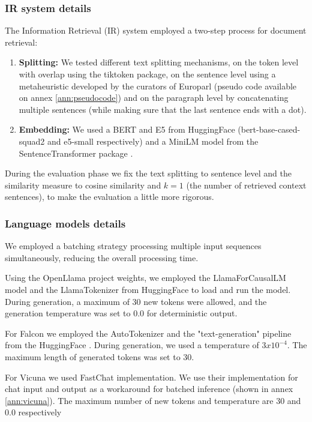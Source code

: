 \documentclass[a4paper,12pt]{article}
\begin{document}
\subsubsection*{IR system details}
The Information Retrieval (IR) system employed a two-step process for document retrieval:

\begin{enumerate}
	\item \textbf{Splitting:} We tested different text splitting mechanisms, on the token level with overlap using the tiktoken package, 
    on the sentence level using a metaheuristic developed by the curators of Europarl \cite{europarl} (pseudo code available on annex \ref{ann:pseudocode}) and on the paragraph level by concatenating multiple sentences (while making sure that the last sentence ends with a dot).
	
    \item \textbf{Embedding:} We used a BERT \cite{bert} and E5 \cite{e5} from HuggingFace \cite{huggingface} (bert-base-cased-squad2 and e5-small respectively) and a MiniLM \cite{minilm} model from the SentenceTransformer package \cite{sbert}.
\end{enumerate}

During the evaluation phase we fix the text splitting to sentence level and the similarity measure to cosine similarity and $k=1$ (the number of retrieved context sentences), to make the evaluation a little more rigorous.  

\subsubsection*{Language models details}
We employed a batching strategy processing multiple input sequences simultaneously, reducing the overall processing time.

Using the OpenLlama project \cite{openllama} weights, we employed the LlamaForCausalLM model and the LlamaTokenizer from HuggingFace \cite{huggingface} to load and run the model. 
During generation, a maximum of 30 new tokens were allowed, and the generation temperature was set to 0.0 for deterministic output. 

For Falcon \cite{falcon} we employed the AutoTokenizer and the "text-generation" pipeline from the HuggingFace \cite{huggingface}. 
During generation, we used a temperature of $3x10^{-4}$. The maximum length of generated tokens was set to 30.

For Vicuna \cite{vicuna} we used FastChat \cite{fastchat} implementation.
We use their implementation for chat input and output as a workaround for batched inference (shown in annex \ref*{ann:vicuna}). 
The maximum number of new tokens and temperature are 30 and 0.0 respectively 
\end{document}
